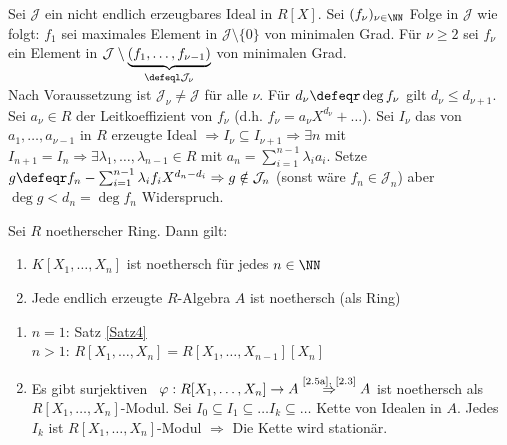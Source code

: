 \begin{Bew} 
  Sei $\mathcal{J}$ ein nicht endlich erzeugbares Ideal in $R[X]$.
  Sei $(f_{\nu})_{\nu \in \NN}$ Folge in $\mathcal{J}$ wie folgt:
  $f_1$ sei maximales Element in $\mathcal{J} \setminus \{0\}$ von minimalen
  Grad. Für $\nu \ge 2$ sei $f_{\nu}$ ein Element in $\mathcal{J} \setminus
  \underset{\defeql \mathcal{J}_{\nu}}{\underbrace{(f_1, \dots , f_{\nu - 1})}}$
  von minimalen Grad.\\
  Nach Voraussetzung ist $\mathcal{J}_{\nu} \not= \mathcal{J}$ für alle $\nu$.
  Für $d_{\nu} \defeqr \deg{f_{\nu}}$ gilt $d_{\nu} \le d_{\nu + 1}$.
  Sei $a_{\nu} \in R$ der Leitkoeffizient von $f_{\nu}$ (d.h. $f_{\nu} =
  a_{\nu} X^{d_{\nu}} + \dots$). Sei $I_{\nu}$ das von $a_1, \dots , a_{\nu -1}$
  in $R$ erzeugte Ideal $\Rightarrow I_{\nu} \subseteq I_{\nu + 1} \Rightarrow
  \exists n$ mit $I_{n+1} = I_n \Rightarrow \exists \lambda_1, \dots ,
  \lambda_{n-1} \in R$ mit $a_n = \sum_{i=1}^{n-1} \lambda_i a_i$.
  Setze $g \defeqr f_n - \sum_{i=1}^{n-1} \lambda_i f_i X^{d_n - d_i}
  \Rightarrow g \notin \mathcal{J}_n$ (sonst wäre $f_n \in \mathcal{J}_n$) aber
  $\deg{g} < d_n = \deg{f_n}$ Widerspruch.
\end{Bew}

\begin{Folg} 
  Sei $R$ noetherscher Ring. Dann gilt:
  \begin{enumerate}
    \item \label{2.5a} $K[X_1, \dots , X_n]$ ist noethersch für jedes $n \in
    \NN$
    \item Jede endlich erzeugte $R$-Algebra $A$ ist noethersch (als Ring)
  \end{enumerate}
\end{Folg}

\begin{Bew} 
  \begin{enumerate} 
    \item $n=1$: Satz \ref{Satz4}\\
          $n>1$: $R[X_1, \dots , X_n] = R[X_1, \dots , X_{n-1}][X_n]$
    \item Es gibt surjektiven \RAlgHom\ $\varphi: R[X_1, \dots
          , X_n] \to A \overset{\text{\scriptsize \ref{2.5a},
          \ref{2.3}}}{\Rightarrow} A$ ist noethersch als $R[X_1, \dots ,
          X_n]$-Modul. Sei $I_0 \subseteq I_1 \subseteq \dots I_k \subseteq
          \dots$ Kette von Idealen in $A$. Jedes $I_k$ ist $R[X_1, \dots ,
          X_n]$-Modul $\Rightarrow$ Die Kette wird stationär.
\end{enumerate}
\end{Bew}
